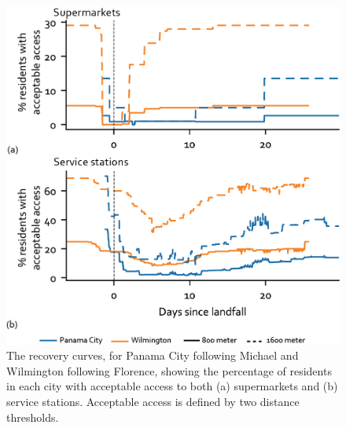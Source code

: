 \documentclass[onecolumn,doublespacing]{risa}
\begin{document}
\begin{figure}[h]
    \centering
    \includegraphics[width=0.5\linewidth]{report/fig/sufficient_only.png}
    \caption{The recovery curves, for Panama City following Michael and Wilmington following Florence, showing the percentage of residents in each city with acceptable access to both (a) supermarkets and (b) service stations. Acceptable access is defined by two distance thresholds. 
    }
    \label{fig:threshold}
\end{figure}
\end{document}
